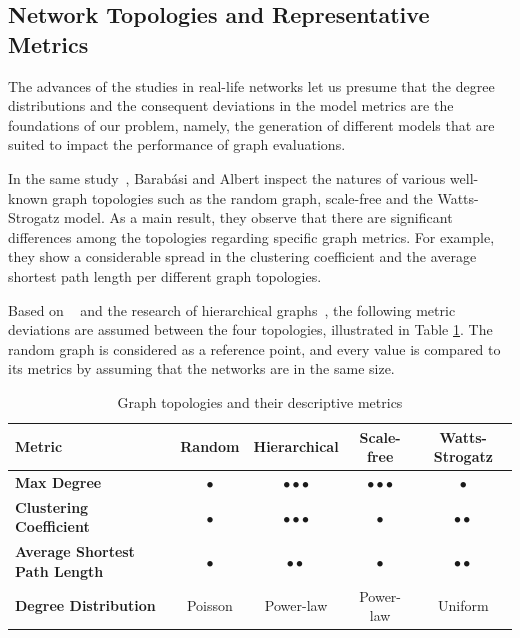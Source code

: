 \subsection{Network Topologies and Representative Metrics}

The advances of the studies in real-life networks let us presume that the degree distributions and the consequent deviations in the model metrics are the foundations of our problem, namely, the generation of different models that are suited to impact the performance of graph evaluations.

In the same study~\cite{statistical_mechanics}, Barabási and Albert inspect the natures of various well-known graph topologies such as the random graph, scale-free and the Watts-Strogatz model. As a main result, they observe that there are significant differences among the topologies regarding specific graph metrics. For example, they show a considerable spread in the clustering coefficient and the average shortest path length per different graph topologies. 

Based on ~\cite{statistical_mechanics} and the research of hierarchical graphs~\cite{hierarchical}, the following metric deviations are assumed	between the four topologies, illustrated in Table \ref{tab:topology_metrics}. The random graph is considered as a reference point, and every value is compared to its metrics by assuming that the networks are in the same size.
\begin{table}[ht]
	\footnotesize
	\centering
	
	\begin{tabular}{ l c c c c}
		\toprule
		Metric & Random & Hierarchical & Scale-free & Watts-Strogatz \\ 
		\midrule 
		\textbf{Max Degree} & $\bullet$ & $\bullet \bullet \bullet$ & $\bullet \bullet \bullet$ & $\bullet$ \\ \hline
		\textbf{Clustering Coefficient} & $\bullet$ & $\bullet \bullet \bullet$ & $\bullet$ & $\bullet \bullet $\\ \hline
		\textbf{Average Shortest Path Length} & $\bullet$ & $\bullet \bullet$ & $\bullet$ & $\bullet \bullet$ \\ \hline
		\textbf{Degree Distribution} & Poisson & Power-law & Power-law & Uniform \\ \hline
		\bottomrule
	\end{tabular}
	\caption{Graph topologies and their descriptive metrics}
	\label{tab:topology_metrics}
\end{table}

